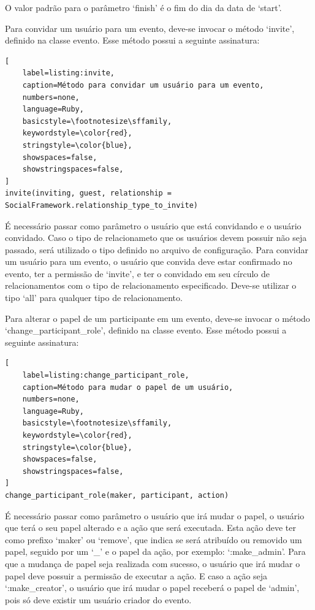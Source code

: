 O valor padrão para o parâmetro `finish' é o fim do dia da data de `start'.

Para convidar um usuário para um evento, deve-se invocar o método `invite', definido na classe evento. Esse método possui a seguinte assinatura:

\begin{lstlisting}[
    label=listing:invite,
    caption=Método para convidar um usuário para um evento,
    numbers=none,
    language=Ruby,
    basicstyle=\footnotesize\sffamily,
    keywordstyle=\color{red},
    stringstyle=\color{blue},
    showspaces=false,
    showstringspaces=false,
]
invite(inviting, guest, relationship = SocialFramework.relationship_type_to_invite)
\end{lstlisting}

É necessário passar como parâmetro o usuário que está convidando e o usuário convidado. Caso o tipo de relacionameto que os usuários devem possuir não seja passado, será utilizado o tipo definido no arquivo de configuração. Para convidar um usuário para um evento, o usuário que convida deve estar confirmado no evento, ter a permissão de `invite', e ter o convidado em seu círculo de relacionamentos com o tipo de relacionamento especificado. Deve-se utilizar o tipo `all' para qualquer tipo de relacionamento.

Para alterar o papel de um participante em um evento, deve-se invocar o método `change\_participant\_role', definido na classe evento. Esse método possui a seguinte assinatura:

\begin{lstlisting}[
    label=listing:change_participant_role,
    caption=Método para mudar o papel de um usuário,
    numbers=none,
    language=Ruby,
    basicstyle=\footnotesize\sffamily,
    keywordstyle=\color{red},
    stringstyle=\color{blue},
    showspaces=false,
    showstringspaces=false,
]
change_participant_role(maker, participant, action)
\end{lstlisting}

É necessário passar como parâmetro o usuário que irá mudar o papel, o usuário que terá o seu papel alterado e a ação que será executada. Esta ação deve ter como prefixo `maker' ou `remove', que indica se será atribuído ou removido um papel, seguido por um `\_' e o papel da ação, por exemplo: `:make\_admin'. Para que a mudança de papel seja realizada com sucesso, o usuário que irá mudar o papel deve possuir a permissão de executar a ação. E caso a ação seja `:make\_creator', o usuário que irá mudar o papel receberá o papel de `admin', pois só deve existir um usuário criador do evento.

